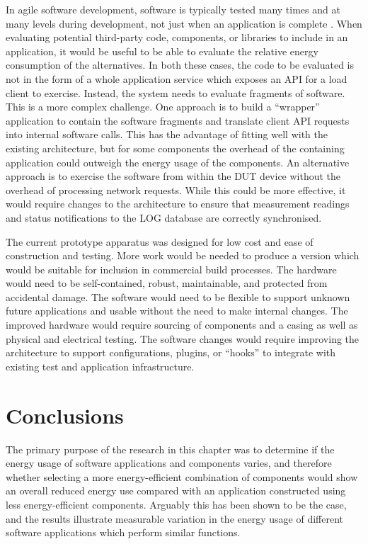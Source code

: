 In agile software development, software is typically tested many times and at many levels during development, not just when an application is complete \citep{Fowler2012}. When evaluating potential third-party code, components, or libraries to include in an application, it would be useful to be able to evaluate the relative energy consumption of the alternatives. In both these cases, the code to be evaluated is not in the form of a whole application service which exposes an API for a load client to exercise. Instead, the system needs to evaluate fragments of software. This is a more complex challenge. One approach is to build a \enquote{wrapper} application to contain the software fragments and translate client API requests into internal software calls. This has the advantage of fitting well with the existing architecture, but for some components the overhead of the containing application could outweigh the energy usage of the components. An alternative approach is to exercise the software from within the DUT device without the overhead of processing network requests. While this could be more effective, it would require changes to the architecture to ensure that measurement readings and status notifications to the LOG database are correctly synchronised.

The current prototype apparatus was designed for low cost and ease of construction and testing. More work would be needed to produce a version which would be suitable for inclusion in commercial build processes. The hardware would need to be self-contained, robust, maintainable, and protected from accidental damage. The software would need to be flexible to support unknown future applications and usable without the need to make internal changes. The improved hardware would require sourcing of components and a casing as well as physical and electrical testing. The software changes would require improving the architecture to support configurations, plugins, or \enquote{hooks} to integrate with existing test and application infrastructure.

\section{Conclusions}
\label{testrig:conclusions}

The primary purpose of the research in this chapter was to determine if the energy usage of software applications and components varies, and therefore whether selecting a more energy-efficient combination of components would show an overall reduced energy use compared with an application constructed using less energy-efficient components. Arguably this has been shown to be the case, and the results illustrate measurable variation in the energy usage of different software applications which perform similar functions.

